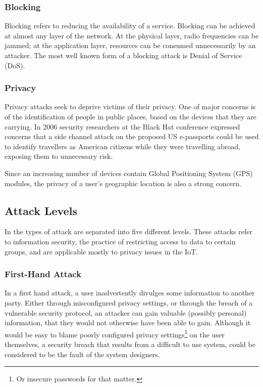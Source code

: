 \documentclass[10pt,journal,compsoc]{IEEEtran}
\begin{document}
\subsubsection{Blocking}
Blocking refers to reducing the availability of a service. Blocking can be
achieved at almost any layer of the network. At the physical layer, radio
frequencies can be jammed; at the application layer, resources can be consumed
unnecessarily by an attacker. The most well known form of a blocking attack is
Denial of Service (DoS). 

\subsubsection{Privacy}
Privacy attacks seek to deprive victims of their privacy. One of major concerns
is of the identification of people in public places, based on the devices that
they are carrying. In 2006 security researchers at the Black Hat conference
\cite{Flexilis2006} expressed concerns that a side channel attack on the
proposed US e-passports could be used to identify travellers as American
citizens while they were travelling abroad, exposing them to unnecessary risk.

Since an increasing number of devices contain Global Positioning System (GPS)
modules, the privacy of a user's geographic location is also a strong concern.

\subsection{Attack Levels}
In \cite{Elkhodr2013} the types of attack are separated into five different
levels. These attacks refer to information security, the practice of
restricting access to data to certain groups, and are applicable mostly to
privacy issues in the IoT.

\subsubsection{First-Hand Attack}
In a first hand attack, a user inadvertently divulges some information to
another party. Either through misconfigured privacy settings, or through the
breach of a vulnerable security protocol, an attacker can gain valuable
(possibly personal) information, that they would not otherwise have been able
to gain. Although it would be easy to blame poorly configured privacy
settings\footnote{Or insecure passwords for that matter.} on the user
themselves, a security breach that results from a difficult to use system,
could be considered to be the fault of the system designers. 
\end{document}
